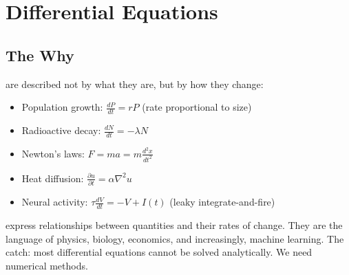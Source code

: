 \chapter{Differential Equations}



\section{The Why}

 are described not by what they are, but by how they change:
\begin{itemize}
    \item Population growth: $\frac{dP}{dt} = rP$ (rate proportional to size)
    \item Radioactive decay: $\frac{dN}{dt} = -\lambda N$
    \item Newton's laws: $F = ma = m\frac{d^2x}{dt^2}$
    \item Heat diffusion: $\frac{\partial u}{\partial t} = \alpha \nabla^2 u$
    \item Neural activity: $\tau \frac{dV}{dt} = -V + I(t)$ (leaky integrate-and-fire)
\end{itemize}

 express relationships between quantities and their rates of change.
They are the language of physics, biology, economics, and increasingly, machine learning.
The catch: most differential equations cannot be solved analytically. We need numerical methods.


